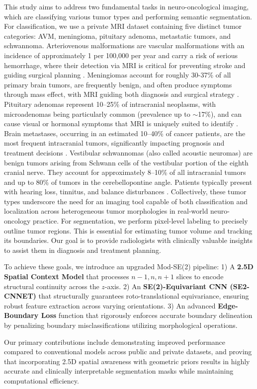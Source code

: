 This study aims to address two fundamental tasks in neuro-oncological imaging, which are classifying various tumor types and performing semantic segmentation. For classification, we use a private MRI dataset containing five distinct tumor categories: AVM, meningioma, pituitary adenoma, metastatic tumors, and schwannoma. Arteriovenous malformations are vascular malformations with an incidence of approximately 1 per 100,000 per year and carry a risk of serious hemorrhage, where their detection via MRI is critical for preventing stroke and guiding surgical planning \cite{30,31}. Meningiomas account for roughly 30-37\% of all primary brain tumors, are frequently benign, and often produce symptoms through mass effect, with MRI guiding both diagnosis and surgical strategy \cite{32}. Pituitary adenomas represent 10–25\% of intracranial neoplasms, with microadenomas being particularly common (prevalence up to $\sim$17\%), and can cause visual or hormonal symptoms that MRI is uniquely suited to identify \cite{33}. Brain metastases, occurring in an estimated 10–40\% of cancer patients, are the most frequent intracranial tumors, significantly impacting prognosis and treatment decisions \cite{34}. Vestibular schwannomas (also called acoustic neuromas) are benign tumors arising from Schwann cells of the vestibular portion of the eighth cranial nerve. They account for approximately 8–10\% of all intracranial tumors and up to 80\% of tumors in the cerebellopontine angle. Patients typically present with hearing loss, tinnitus, and balance disturbances \cite{35}. Collectively, these tumor types underscore the need for an imaging tool capable of both classification and localization across heterogeneous tumor morphologies in real-world neuro-oncology practice. For segmentation, we perform pixel-level labeling to precisely outline tumor regions. This is essential for estimating tumor volume and tracking its boundaries. Our goal is to provide radiologists with clinically valuable insights to assist them in diagnosis and treatment planning.

To achieve these goals, we introduce an upgraded Mod-SE(2) pipeline:
1) A \textbf{2.5D Spatial Context Model} that processes $n-1, n, n+1$ slices to encode structural continuity across the $z$-axis.
2) An \textbf{SE(2)-Equivariant CNN (SE2-CNNET)} that structurally guarantees roto-translational equivariance, ensuring robust feature extraction across varying orientations.
3) An advanced \textbf{Edge-Boundary Loss} function that rigorously enforces accurate boundary delineation by penalizing boundary misclassifications utilizing morphological operations.

Our primary contributions include demonstrating improved performance compared to conventional models across public and private datasets, and proving that incorporating 2.5D spatial awareness with geometric priors results in highly accurate and clinically interpretable segmentation masks while maintaining computational efficiency.
